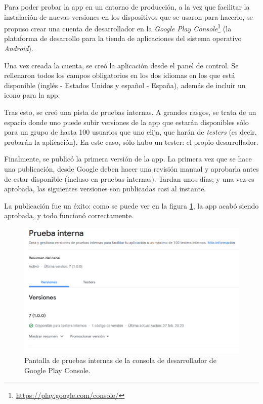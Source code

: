 \documentclass[11pt,spanish,listoffigures,listoftables,table,hyphens,dvipsnames]{tfgetsinf}
\begin{document}
Para poder probar la app en un entorno de producción, a la vez que facilitar la instalación de nuevas versiones en los dispositivos que se usaron para hacerlo, se propuso crear una cuenta de desarrollador en la \emph{Google Play Console}\footnote{\url{https://play.google.com/console/}} (la plataforma de desarrollo para la tienda de aplicaciones del sistema operativo \emph{Android}).

Una vez creada la cuenta, se creó la aplicación desde el panel de control. Se rellenaron todos los campos obligatorios en los dos idiomas en los que está disponible (inglés - Estados Unidos y español - España), además de incluir un icono para la app.

Tras esto, se creó una pista de pruebas internas. A grandes rasgos, se trata de un espacio donde uno puede subir versiones de la app que estarán disponibles sólo para un grupo de hasta 100 usuarios que uno elija, que harán de \emph{testers} (es decir, probarán la aplicación). En este caso, sólo hubo un tester: el propio desarrollador.

Finalmente, se publicó la primera versión de la app. La primera vez que se hace una publicación, desde Google deben hacer una revisión manual y aprobarla antes de estar disponible (incluso en pruebas internas). Tardan unos días; y una vez es aprobada, las siguientes versiones son publicadas casi al instante.

La publicación fue un éxito: como se puede ver en la figura \ref{figura:play-console}, la app acabó siendo aprobada, y todo funcionó correctamente.

\begin{figure}[ht]
   \centering
   \includegraphics[width=\textwidth]{prueba-interna-google-play-console.png}
   \caption{Pantalla de pruebas internas de la consola de desarrollador de Google Play Console.}
   \label{figura:play-console}
\end{figure}
\end{document}

